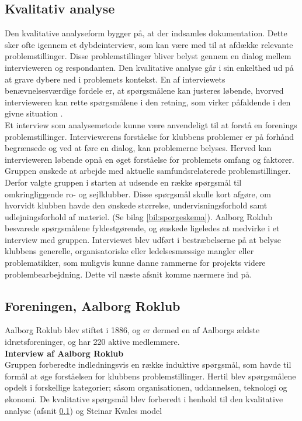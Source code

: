 
\subsection{Kvalitativ analyse}
\label{sec:kvalitativ_analyse}
Den kvalitative analyseform bygger på, at der indsamles dokumentation. Dette sker ofte igennem et dybdeinterview, som kan være med til at afdække relevante problemstillinger. Disse problemstillinger bliver belyst gennem en dialog mellem intervieweren og respondanten. Den kvalitative analyse går i sin enkelthed ud på at grave dybere ned i problemets kontekst. En af interviewets benævnelsesværdige fordele er, at spørgsmålene kan justeres løbende, hvorved intervieweren kan rette spørgsmålene i den retning, som virker påfaldende i den givne situation \cite{analyse_danmark}. \\

Et interview som analysemetode kunne være anvendeligt til at forstå en forenings problemstillinger. Interviewerens forståelse for klubbens problemer er på forhånd begrænsede og ved at føre en dialog, kan problemerne belyses. Herved kan intervieweren løbende opnå en øget forståelse for problemets omfang og faktorer. \\

Gruppen ønskede at arbejde med aktuelle samfundsrelaterede problemstillinger. Derfor valgte gruppen i starten at udsende en række spørgsmål til omkringliggende ro- og sejlklubber. Disse spørgsmål skulle kort afgøre, om hvorvidt klubben havde den ønskede størrelse, undervisningsforhold samt udlejningsforhold af materiel. (Se bilag \ref{bil:sporgeskema}). Aalborg Roklub besvarede spørgsmålene fyldestgørende, og ønskede ligeledes at medvirke i et interview med gruppen. Interviewet blev udført i bestræbelserne på at belyse klubbens generelle, organisatoriske eller ledelsesmæssige mangler eller problematikker, som muligvis kunne danne rammerne for projekts videre problembearbejdning. Dette vil næste afsnit komme nærmere ind på. 

\subsection{Foreningen, Aalborg Roklub}
\label{sec:foreningen_ark}
Aalborg Roklub blev stiftet i 1886, og er dermed en af Aalborgs ældste idrætsforeninger, og har 220 aktive medlemmere.\\

{\bf Interview af Aalborg Roklub}\\
Gruppen forberedte indledningsvis en række induktive spørgsmål, som havde til formål at øge forståelsen for klubbens problemstillinger. Hertil blev spørgsmålene opdelt i forskellige kategorier; såsom organisationen, uddannelsen, teknologi og økonomi. De kvalitative spørgsmål blev forberedt i henhold til den kvalitative analyse (afsnit \ref{sec:kvalitativ_analyse}) og Steinar Kvales model \cite{BOOK_KVALE}

